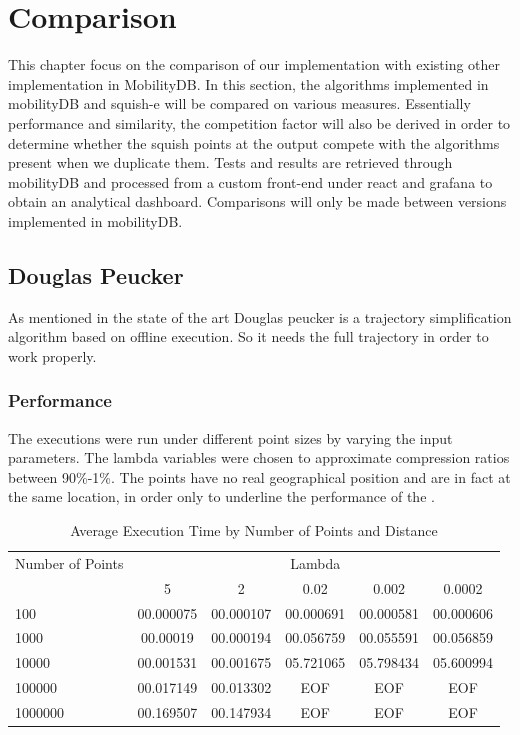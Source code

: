 

\chapter{Comparison}
This chapter focus on the comparison of our implementation with existing other implementation in MobilityDB.  In this section, the algorithms implemented in mobilityDB and squish-e will be compared on various measures. Essentially performance and similarity, the competition factor will also be derived in order to determine whether the squish points at the output compete with the algorithms present when we duplicate them. Tests and results are retrieved through mobilityDB and processed from a custom front-end under react and grafana to obtain an analytical dashboard. Comparisons will only be made between versions implemented in mobilityDB.


\section{Douglas Peucker}

As mentioned in the state of the art Douglas peucker is a trajectory simplification algorithm based on offline execution. So it needs the full trajectory in order to work properly. 

\subsection{Performance}
The executions were run under different point sizes by varying the input parameters. The lambda variables were chosen to approximate compression ratios between 90\%-1\%. The points have no real geographical position and are in fact at the same location, in order only to underline the performance of the .

\begin{table}[htbp]
    \centering
    \label{tab:execution_time_douglas}
    \begin{tabular}{@{}lccccc@{}}
        \toprule
        Number of Points & \multicolumn{5}{c}{Lambda} \\
        \cmidrule{2-6}
        & 5         & 2       & 0.02        & 0.002       & 0.0002       \\
        \midrule
        100              & 00.000075 & 00.000107 & 00.000691 & 00.000581 & 00.000606 \\
        1000             & 00.00019  & 00.000194 & 00.056759 & 00.055591 & 00.056859 \\
        10000            & 00.001531 & 00.001675 & 05.721065 & 05.798434 & 05.600994 \\
        100000           & 00.017149  & 00.013302  & EOF & EOF & EOF \\
        1000000          & 00.169507 & 00.147934 & EOF & EOF & EOF \\
        \bottomrule
    \end{tabular}
    \caption{Average Execution Time by Number of Points and Distance}
\end{table}


